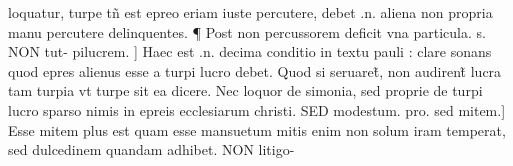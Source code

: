 \documentclass{article}
\begin{document}
\begin{pages}
loquatur, turpe tñ est epreo eriam iuste percutere, debet .n. aliena non propria manu percutere delinquentes. ¶ Post non percussorem  deficit vna particula. s. NON tut- pilucrem. ] Haec est .n. decima conditio in textu pauli : clare sonans quod epres alienus esse a turpi lucro debet. Quod si seruaret̃, non audirent̃ lucra tam turpia vt turpe sit ea dicere. Nec loquor de simonia, sed proprie de turpi lucro sparso nimis in epreis ecclesiarum christi. SED modestum. pro. sed mitem.] Esse mitem plus est quam esse mansuetum mitis enim non solum iram temperat, sed dulcedinem quandam adhibet. NON litigo-  \pend
\endnumbering
\end{pages}
\end{document}
